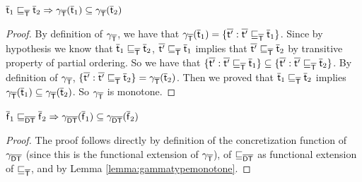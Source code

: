 \documentclass{llncs}
\begin{document}
\begin{lemma}
\label{lemma:gammatypemonotone}
$\ael{t}_1 \aorder_{\types} \ael{t}_2 \Rightarrow \gamma_{\types}(\ael{t}_1) \subseteq \gamma_{\types}(\ael{t}_2)$
\begin{proof}
By definition of $\gamma_{\types}$, we have that $\gamma_{\types}(\ael{t}_1)=\{\ael{t'} : \ael{t'} \aorder_{\types} \ael{t}_1\}$. Since by hypothesis we know that $\ael{t}_1 \aorder_{\types} \ael{t}_2$, $\ael{t'} \aorder_{\types} \ael{t}_1$ implies that $\ael{t'} \aorder_{\types} \ael{t}_2$ by transitive property of partial ordering. So we have that $\{\ael{t'} : \ael{t'} \aorder_{\types} \ael{t}_1\} \subseteq \{\ael{t'} : \ael{t'} \aorder_{\types} \ael{t}_2\}$. By definition of $\gamma_{\types}$, $\{\ael{t'} : \ael{t'} \aorder_{\types} \ael{t}_2\}=\gamma_{\types}(\ael{t}_2)$. Then we proved that $\ael{t}_1 \aorder_{\types} \ael{t}_2$ implies $\gamma_{\types}(\ael{t}_1) \subseteq \gamma_{\types}(\ael{t}_2)$. So $\gamma_{\types}$ is monotone.
\end{proof}
\end{lemma}


\begin{lemma}
\label{lemma:gammadynamictypemonotone}
$\ael{f}_1 \aorder_{\dynamictype} \ael{f}_2 \Rightarrow \gamma_{\dynamictype}(\ael{f}_1) \subseteq \gamma_{\dynamictype}(\ael{f}_2)$
\begin{proof}
The proof follows directly by definition of the concretization function of $\gamma_{\dynamictype}$ (since this is the functional extension of $\gamma_{\types}$), of $\aorder_{\dynamictype}$ as functional extension of $\aorder_{\types}$, and by Lemma \ref{lemma:gammatypemonotone}.
\end{proof}
\end{lemma}
\end{document}
